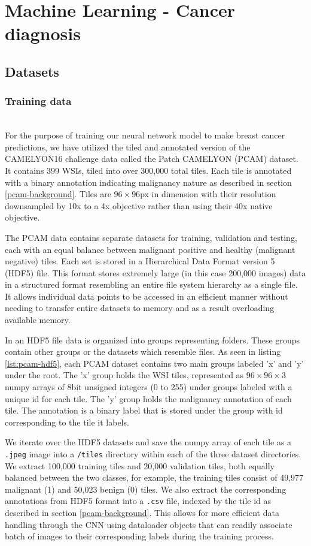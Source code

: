 \documentclass{l4proj}
\begin{document}
\section{Machine Learning - Cancer diagnosis}
\subsection{Datasets}
\subsubsection{Training data}\hfill\\
For the purpose of training our neural network model to make breast cancer predictions, we have utilized the tiled and annotated version of the CAMELYON16 challenge data called the Patch CAMELYON (PCAM) dataset. It contains 399 WSIs, tiled into over 300,000 total tiles. Each tile is annotated with a binary annotation indicating malignancy nature as described in section \ref{pcam-background}. Tiles are \(96 \times 96\)px in dimension with their resolution downsampled by 10x to a 4x objective rather than using their 40x native objective. 

The PCAM data contains separate datasets for training, validation and testing, each with an equal balance between malignant positive and healthy (malignant negative) tiles. Each set is stored in a Hierarchical Data Format version 5 (HDF5) file. This format stores extremely large (in this case 200,000 images) data in a structured format resembling an entire file system hierarchy as a single file. It allows individual data points to be accessed in an efficient manner without needing to transfer entire datasets to memory and as a result overloading available memory. 

In an HDF5 file data is organized into groups representing folders. These groups contain other groups or the datasets which resemble files. As seen in listing \ref{lst:pcam-hdf5}, each PCAM dataset contains two main groups labeled 'x' and 'y' under the root. The 'x' group holds the WSI tiles, represented as \(96 \times 96 \times 3\) numpy arrays of 8bit unsigned integers (0 to 255) under groups labeled with a unique id for each tile. The 'y' group holds the malignancy annotation of each tile. The annotation is a binary label that is stored under the group with id corresponding to the tile it labels. 

We iterate over the HDF5 datasets and save the numpy array of each tile as a \texttt{.jpeg} image into a \texttt{/tiles} directory within each of the three dataset directories. We extract 100,000 training tiles and 20,000 validation tiles, both equally balanced between the two classes, for example, the training tiles consist of 49,977 malignant (1) and 50,023 benign (0) tiles. We also extract the corresponding annotations from HDF5 format into a \texttt{.csv} file, indexed by the tile id as described in section \ref{pcam-background}. This allows for more efficient data handling through the CNN using dataloader objects that can readily associate batch of images to their corresponding labels during the training process. 
\end{document}

